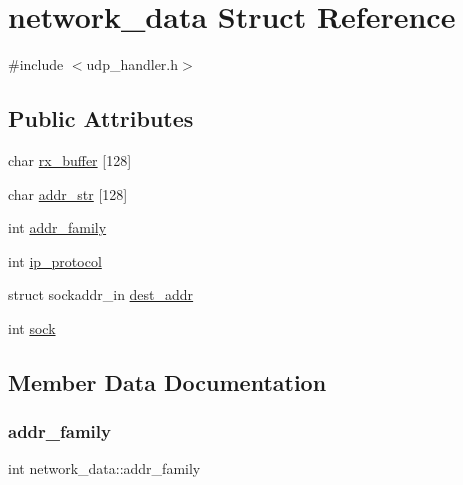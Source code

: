 \hypertarget{structnetwork__data}{}\section{network\+\_\+data Struct Reference}
\label{structnetwork__data}


{\ttfamily \#include $<$udp\+\_\+handler.\+h$>$}

\subsection*{Public Attributes}
\begin{DoxyCompactItemize}
\item 
char \hyperlink{structnetwork__data_a9346e7a82edd41c346d1528ef301469b}{rx\+\_\+buffer} \mbox{[}128\mbox{]}
\item 
char \hyperlink{structnetwork__data_a6e8bd28f3dda27bcedd8b6e39257bf9e}{addr\+\_\+str} \mbox{[}128\mbox{]}
\item 
int \hyperlink{structnetwork__data_a68f41514e366d2255d8ab802ec4ea146}{addr\+\_\+family}
\item 
int \hyperlink{structnetwork__data_a2e35f88440947101eeeb8dc91a43d5e5}{ip\+\_\+protocol}
\item 
struct sockaddr\+\_\+in \hyperlink{structnetwork__data_a553d72b8506e9098215451adffd330d4}{dest\+\_\+addr}
\item 
int \hyperlink{structnetwork__data_ab056807bd5bb97ce18f27e6b233de0b3}{sock}
\end{DoxyCompactItemize}


\subsection{Member Data Documentation}
\mbox{\label{structnetwork__data_a68f41514e366d2255d8ab802ec4ea146}} 
\subsubsection{\texorpdfstring{addr\+\_\+family}{addr\_family}}
{\footnotesize\ttfamily int network\+\_\+data\+::addr\+\_\+family}

\mbox{\label{structnetwork__data_a6e8bd28f3dda27bcedd8b6e39257bf9e}} 
